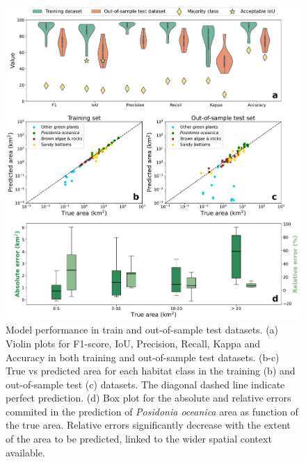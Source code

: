 \begin{figure}[H]
    \centering
    \includegraphics[width=\textwidth]{Figures/Model_performance.pdf}
    \caption{Model performance in train and out-of-sample test datasets. (a)
        Violin plots for F1-score, IoU, Precision, Recall, Kappa and Accuracy
        in both
        training and out-of-sample test datasets. (b-c) True vs predicted area
        for each
        habitat class in the training (b) and out-of-sample test (c) datasets.
        The
        diagonal dashed line indicate perfect prediction. (d) Box plot for the
        absolute
        and relative errors commited in the prediction of \textit{Posidonia
            oceanica}
        area as function of the true area. Relative errors significantly
        decrease with
        the extent of the area to be predicted, linked to the wider spatial
        context
        available.}
    \label{fig:model_performance}
\end{figure}

